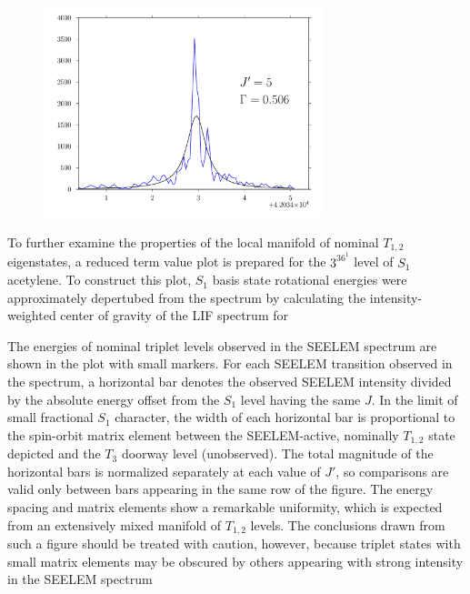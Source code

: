 \documentclass[12pt]{mitthesis}
\begin{document}
\begin{figure}
  \includegraphics[width=3.2in]{3361-q5-seelemfit}
\end{figure}


To further examine the properties of the local manifold of nominal
$T_{1,2}$ eigenstates, a reduced term value plot is prepared for the
$3^36^1$  level of $S_1$ acetylene.  To construct this plot,
$S_1$ basis state rotational energies were approximately depertubed
from the spectrum by calculating the intensity-weighted center of
gravity of the LIF spectrum for

The energies of nominal triplet levels observed in the SEELEM spectrum
are shown in the plot with small markers.  For each SEELEM transition
observed in the spectrum, a horizontal bar denotes the observed SEELEM
intensity divided by the absolute energy offset from the $S_1$ level
having the same $J$.  In the limit of small fractional $S_1$
character, the width of each horizontal bar is proportional to the
spin-orbit matrix element between the SEELEM-active, nominally
$T_{1,2}$ state depicted and the $T_3$ doorway level (unobserved).
The total magnitude of the horizontal bars is normalized separately at
each value of $J'$, so comparisons are valid only between bars
appearing in the same row of the figure.  The energy spacing and
matrix elements show a remarkable uniformity, which is expected from
an extensively mixed manifold of $T_{1,2}$ levels.  The conclusions
drawn from such a figure should be treated with caution, however,
because triplet states with small matrix elements may be obscured by
others appearing with strong intensity in the SEELEM spectrum

\end{document}

